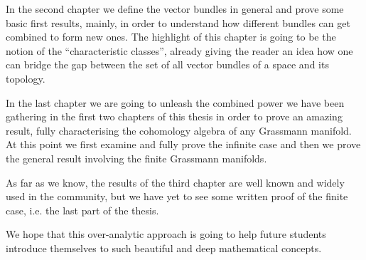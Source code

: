 In the second chapter we define the vector bundles in general and prove some basic first results, mainly, in order to understand how different bundles can get combined to form new ones. The highlight of this chapter is going to be the notion of the ``characteristic classes'', already giving the reader an idea how one can bridge the gap between the set of all vector bundles of a space and its topology.

In the last chapter we are going to unleash the combined power we have been gathering in the first two chapters of this thesis in order to prove an amazing result, fully characterising the cohomology algebra of any Grassmann manifold. At this point we first examine and fully prove the infinite case and then we prove the general result involving the finite Grassmann manifolds.

As far as we know, the results of the third chapter are well known and widely used in the community, but we have yet to see some written proof of the finite case, i.e. the last part of the thesis.

We hope that this over-analytic approach is going to help future students introduce themselves to such beautiful and deep mathematical concepts.
